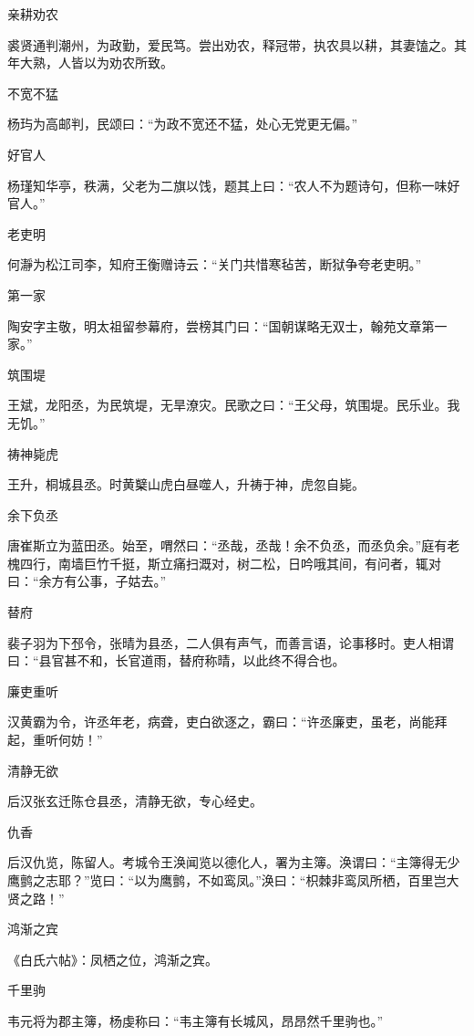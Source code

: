 \documentclass[a4paper,12pt,UTF8,twoside]{ctexbook}
\begin{document}
    亲耕劝农
    
    裘贤通判潮州，为政勤，爱民笃。尝出劝农，释冠带，执农具以耕，其妻馌之。其年大熟，人皆以为劝农所致。
    
    不宽不猛
    
    杨玙为高邮判，民颂曰：“为政不宽还不猛，处心无党更无偏。”
    
    好官人
    
    杨瑾知华亭，秩满，父老为二旗以饯，题其上曰：“农人不为题诗句，但称一味好官人。”
    
    老吏明
    
    何瀞为松江司李，知府王衡赠诗云：“关门共惜寒毡苦，断狱争夸老吏明。”
    
    第一家
    
    陶安字主敬，明太祖留参幕府，尝榜其门曰：“国朝谋略无双士，翰苑文章第一家。”
    
    筑围堤
    
    王斌，龙阳丞，为民筑堤，无旱潦灾。民歌之曰：“王父母，筑围堤。民乐业。我无饥。”
    
    祷神毙虎
    
    王升，桐城县丞。时黄櫱山虎白昼噬人，升祷于神，虎忽自毙。
    
    余下负丞
    
    唐崔斯立为蓝田丞。始至，喟然曰：“丞哉，丞哉！余不负丞，而丞负余。”庭有老槐四行，南墙巨竹千挺，斯立痛扫溉对，树二松，日吟哦其间，有问者，辄对曰：“余方有公事，子姑去。”
    
    替府
    
    裴子羽为下邳令，张晴为县丞，二人俱有声气，而善言语，论事移时。吏人相谓曰：“县官甚不和，长官道雨，替府称晴，以此终不得合也。
    
    廉吏重听
    
    汉黄霸为令，许丞年老，病聋，吏白欲逐之，霸曰：“许丞廉吏，虽老，尚能拜起，重听何妨！”
    
    清静无欲
    
    后汉张玄迁陈仓县丞，清静无欲，专心经史。
    
    仇香
    
    后汉仇览，陈留人。考城令王涣闻览以德化人，署为主簿。涣谓曰：“主簿得无少鹰鹯之志耶？”览曰：“以为鹰鹯，不如鸾凤。”涣曰：“枳棘非鸾凤所栖，百里岂大贤之路！”
    
    鸿渐之宾
    
    《白氏六帖》：凤栖之位，鸿渐之宾。
    
    千里驹
    
    韦元将为郡主簿，杨虔称曰：“韦主簿有长城风，昂昂然千里驹也。”
    
\end{document}
